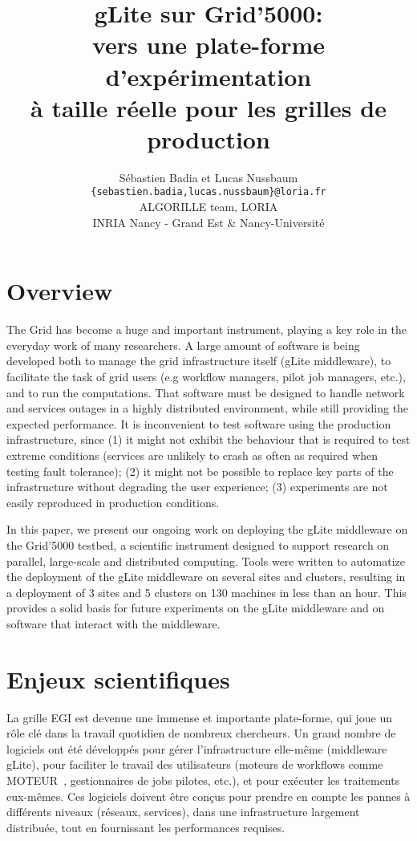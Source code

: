 \documentclass[a4paper,11pt]{article}
\title{gLite sur Grid'5000:\\ vers une plate-forme d'expérimentation\\ à taille réelle pour les grilles de production}
\date{}
\author{Sébastien Badia et Lucas Nussbaum\\
\texttt{\normalsize \{sebastien.badia,lucas.nussbaum\}@loria.fr}\\[1em]
\normalsize ALGORILLE team, LORIA\\
INRIA Nancy - Grand Est \& Nancy-Université}
\begin{document}
\maketitle

\section{Overview}

The Grid has become a huge and important instrument, playing a key role in the
everyday work of many researchers. A large amount of software is being developed
both to manage the grid infrastructure itself (gLite middleware),
to facilitate the task of grid users (e.g workflow managers,
pilot job managers, etc.), and to run the computations.
That software must be designed to handle network and services outages in a
highly distributed environment, while still providing the expected performance.
It is inconvenient to test software using the production infrastructure, since
(1) it might not exhibit the behaviour that is required to test extreme
conditions (services are unlikely to crash as often as required when testing
fault tolerance); (2) it might not be possible to replace key parts of the
infrastructure without degrading the user experience; (3) experiments are not easily reproduced in production conditions.

In this paper, we present our ongoing work on deploying the gLite middleware on
the Grid'5000 testbed, a scientific instrument designed to support research on
parallel, large-scale and distributed computing. Tools were written to
automatize the deployment of the gLite middleware on several sites and
clusters, resulting in a deployment of 3 sites and 5 clusters on 130 machines
in less than an hour.  This provides a solid basis for future experiments on
the gLite middleware and on software that interact with the middleware.

\section{Enjeux scientifiques}

La grille EGI est devenue une immense et importante plate-forme, qui joue un rôle
clé dans la travail quotidien de nombreux chercheurs. Un grand nombre de
logiciels ont été développés pour gérer l'infrastructure elle-même (middleware
gLite\cite{glite}), pour faciliter le travail des utilisateurs (moteurs de
workflows comme MOTEUR~\cite{moteur}, gestionnaires de jobs pilotes, etc.), et
pour exécuter les traitements eux-mêmes.
Ces logiciels doivent être conçus pour prendre en compte les pannes à
différents niveaux (réseaux, services), dans une infrastructure largement
distribuée, tout en fournissant les performances requises.
\end{document}
